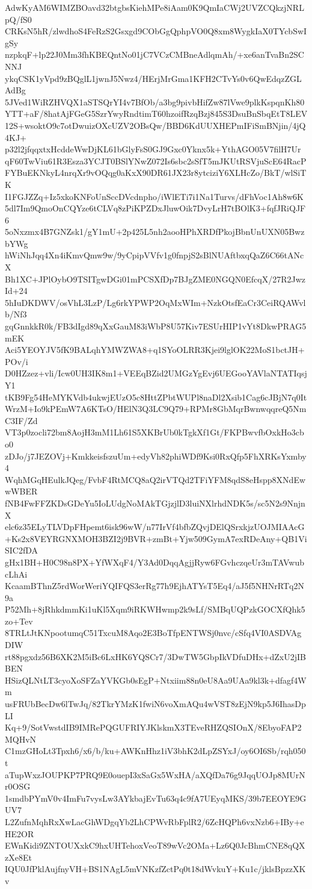 AdwKyAM6WIMZBOavd32btgbsKiehMPe8iAam0K9QmIaCWj2UVZCQkzjNRLpQ/fS0
CRKsN5hR/zlwdhoS4FeRzS2Gsxgd9CObGgQphpVO0Q8xm8WygkIaX0TYcbSwIgSy
nzpkqF+lp22J0Mm3fhKBEQntNo01jC7VCzCMBneAdlqmAh/+xe6anTvaBn2SCNNJ
ykqCSK1yVpd9zBQglL1jwnJ5Nwz4/HErjMrGma1KFH2CTvYs0v6QwEdqzZGLAdBg
5JVed1WiRZHVQX1aSTSQrYI4v7BfOb/a3bg9pivbHifZw87lVwe9plkKspqnKh80
YTT+aF/8hatAjFGeG5SzrYwyRndtimT60hzoifRzqBzj845S3DsuBnSbqEtT8LEV
12S+wsoktO9c7otDwuizOXcUZV2OBsQw/BBD6KdUUXHEPmIFiSmBNjin/4jQ4KJ+
p32l2jfqqxtxHcddeWwDjKL61bGlyFsS0GJ9Gxc0Yknx5k+YthAGO05V7filH7Ur
qF60TwViu61R3Esza3YCJT0BSlYNwZ072Is6sbc2sSfT5mJKUtRSVjuScE64RacP
FYBuEKNkyL4nrqXr9vOQqg0aKxX90DR61JX23r8ytciziY6XLHcZo/BkT/wlSiTK
I1FGJZZq+Iz5xkoKNFoUnSccDVcdnpho/iWlETi7i1Na1Turvs/dFhVoc1Ah8w6K
5dl7Im9QmoOnCQYze6tCLVq8zPiKPZDxJluwOik7DvyLrH7tBOlK3+fqfJRiQJF6
5oNxzmx4B7GNZsk1/gY1mU+2p425L5nh2aooHPhXRDfPkojBbnUnUXN05BwzbYWg
hWiNhJqq4Xn4iKmvQmw9w/9yCpipVVfv1g0fnpjS2sBlNUAftbxqQaZ6C66tANcX
Bh1XC+JPlOybO9TSITgwDGi01mPCSXfDp7BJgZME0NGQN0EfcqX/27R2JwzId+24
5hIuDKDWV/osVhL3LzP/Lg6rkYPWP2OqMxWIm+NzkOtsfEaCr3CeiRQAWvlb/Nf3
gqGnnkkR0k/FB3dIgd89qXxGauM83iWbP8U57Kiv7ESUrHIP1vYt8DkwPRAG5mEK
Aci5YEOYJV5fK9BALqhYMWZWA8+q1SYoOLRR3Kjei9lglOK22MoS1bctJH+POv/i
D0HZzez+vli/Icw0UH3IK8m1+VEEqBZid2UMGzYgEvj6UEGooYAVlaNTATIqsjY1
tKB9Fg54HeMYKVdb4ukwjEUzO5c8HttZPbtWUPl8naDl2Xsib1Cag6cJBjN7q0It
WrzM+Io9kPEmW7A6KTsO/HElN3Q3LC9Q79+RPMr8GbMqrBwnwqqreQ5NmC3IF/Zd
VT3p0zocli72bm8AojH3mM1Lh61S5XKBrUb0kTgkXf1Gt/FKPBwvfbOxkHo3cbo0
zDJo/j7JEZOVj+KmkkeisfszuUm+edyVh82phiWDf9Ksi0RxQfp5FhXRKsYxmby4
WqhMGqHEulkJQeg/FvbF4RtMCQ8aQ2irVTQd2TFiYFM8qdS8eHspp8XNdEwwWBER
fNB4FwFFZKDsGDeYu5IoLUdgNoMAkTGjzjlD3luiNXlrhdNDK5s/sc5N2s9NnjnX
elc6z35ELyTLVDpFHpemt6isk96wW/n77IrVf4bfbZQvjDElQSrxkjzUOJMIAAcG
+Ks2x8VEYRGNXMOH3BZI2j9BVR+zmBt+Yjw509GymA7exRDeAny+QB1ViSIC2fDA
gHx1BH+H0C98n8PX+YfWXqF4/Y3Ad0DqqAgjjRyw6FGvhczqeUr3mTAVwubcLhAi
KcaamBThnZ5rdWorWeriYQIFQS3erRg77h9EjhATYsT5Eq4/aJ5f5NHNrRTq2N9a
P52Mh+8jRhkdmmKi1uKl5Xqm9iRKWHwmp2k9sLf/SMBqUQPzkGOCXfQhk5zo+Tev
8TRLtJtKNpootumqC51TxcuM8Aqo2E3BoTfpENTWSj0nvc/cSfq4VI0ASDVAgDIW
rt88pgxdz56B6XK2M5iBc6LxHK6YQSCr7/3DwTW5GbpIkVDfuDHx+dZxU2jIBBEN
HSizQLNtLT3cyoXoSFZaYVKGb0sEgP+Ntxiim88n0eU8Aa9UAa9kl3k+dfagf4Wm
usFRUbBecDw6lTwJq/82TkrYMzK1fwiN6voXmAQu4wVST8zEjN9kp5J6IhasDpLI
Kq+9/SotVwstdIB9IMRePQGUFRIYJKlskmX3TEveRHZQSIOnX/8EbyoFAP2MQHvN
C1mzGHoLt3Tpxh6/x6/b/ku+AWKnHhz1iV3bhK2dLpZSYxJ/oy6OI6Sb/rqh050t
aTupWxzJOUPKP7PRQ9E0ouepI3xSaGx5WxHA/aXQfDa76g9JqqUOJp8MUrNr0OSG
1smdbPYmV0v4ImFu7vysLw3AYkbajEvTu63q4c9fA7UEyqMKS/39b7EEOYE9GUV7
L2ZufnMqhRxXwLacGhWDgqYb2LhCPWvRbFplR2/6ZcHQPh6vxNzb6+IBy+eHE2OR
EWnKidi9ZNTOUXxkC9hxUHTehoxVeoT89wVc2OMa+Lz6Q0JcBhmCNE8qQXzXe8Et
IQU0JfPklAujfnyVH+BS1NAgL5mVNKzfZctPq0t18dWvkuY+Ku1c/jklsBpzzXKv
